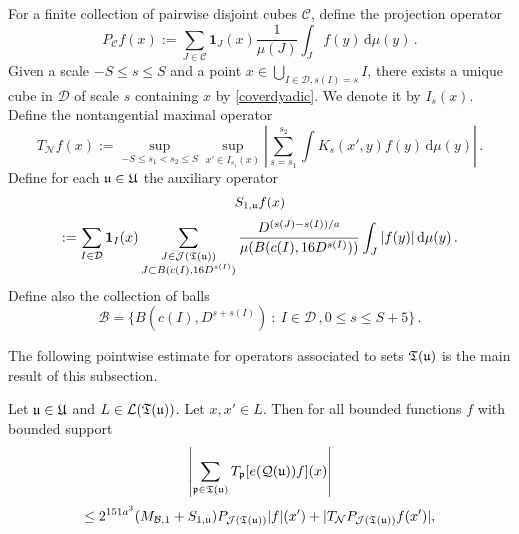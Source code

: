 {For a finite collection of pairwise disjoint cubes $\mathcal{C}$, define the projection operator
$$
    P_{\mathcal{C}}f(x) :=\sum_{J\in\mathcal{C}}\mathbf{1}_J(x) \frac{1}{\mu(J)}\int_J f(y) \, \mathrm{d}\mu(y)\,.
$$
Given a scale $-S \le s\le S$ and a point $x \in \bigcup_{I\in \mathcal{D}, s(I) = s} I$, there exists a unique cube in $\mathcal{D}$ of scale $s$ containing $x$ by \eqref{coverdyadic}. We denote it by $I_s(x)$. Define the nontangential maximal operator
\begin{equation}
    \label{eq-TN-def}
    T_{\mathcal{N}} f(x) := \sup_{-S \le s_1 < s_2 \le S} \sup_{x' \in I_{s_1}(x)} \left| \sum_{s = s_1}^{s_2}  \int K_s(x',y) f(y)  \, \mathrm{d}\mu(y) \right|\,.
\end{equation}
Define for each ${\mathfrak u} \in {\mathfrak U}$ the auxiliary operator
$$
    S_{1,{\mathfrak u}}f(x)
$$
\begin{equation}
    \label{eq-def-S-op}
    :=\sum_{I\in\mathcal{D}} \mathbf{1}_{I}(x) \sum_{\substack{J\in \mathcal{J}({\mathfrak T}({\mathfrak u}))\\
    J\subset B(c(I), 16 D^{s(I)})}} \frac{D^{(s(J) - s(I))/a}}{\mu(B(c(I), 16D^{s(I)}))}\int_J |f(y)| \, \mathrm{d}\mu(y)\,.
\end{equation}
Define also the collection of balls
$$
    \mathcal{B} = \{B(c(I), D^{s + s(I)}) \ : \ I \in \mathcal{D}\,, 0 \le s \le S + 5\}\,.
$$

The following pointwise estimate for operators associated to sets ${\mathfrak T}({\mathfrak u})$ is the main result of this subsection.

\begin{lemma}
    \label{pointwise-tree-estimate}
    Let ${\mathfrak u} \in {\mathfrak U}$ and $L \in \mathcal{L}({\mathfrak T}({\mathfrak u}))$. Let $x, x' \in L$.
    Then for all bounded functions $f$ with bounded support
    $$
        \left|\sum_{{\mathfrak p} \in {\mathfrak T}({\mathfrak u})} T_{{\mathfrak p}}[ e({\mathcal{Q}}({\mathfrak u}))f](x)\right|
    $$
    \begin{equation}
        \label{eq-LJ-ptwise}
        \leq 2^{151a^3}(M_{\mathcal{B},1}+S_{1,{\mathfrak u}})P_{\mathcal{J}({\mathfrak T}({\mathfrak u}))}|f|(x')+|T_{\mathcal{N}}P_{\mathcal{J}({\mathfrak T}({\mathfrak u}))}f(x')|,
    \end{equation}
\end{lemma}


}
